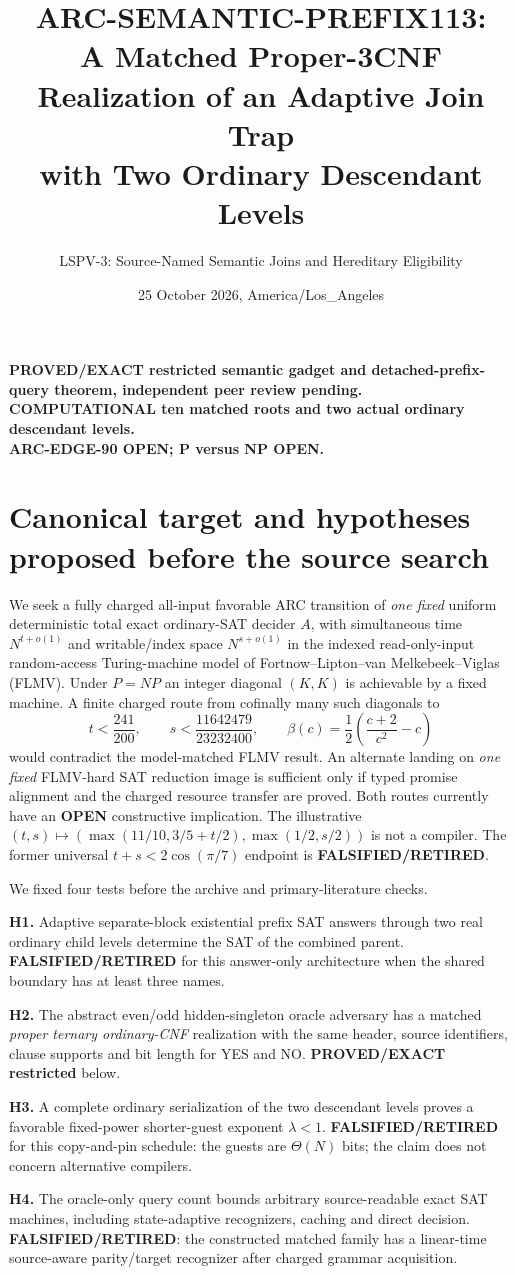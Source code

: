 \documentclass[11pt]{article}
\title{ARC-SEMANTIC-PREFIX113:\\ A Matched Proper-3CNF Realization of an Adaptive Join Trap\\ with Two Ordinary Descendant Levels}
\author{LSPV-3: Source-Named Semantic Joins and Hereditary Eligibility}
\date{25 October 2026, America/Los\_Angeles}
\begin{document}
\maketitle
\begin{center}
\textbf{PROVED/EXACT restricted semantic gadget and detached-prefix-query theorem, independent peer review pending.}\\
\textbf{COMPUTATIONAL ten matched roots and two actual ordinary descendant levels.}\\
\textbf{ARC-EDGE-90 OPEN; P versus NP OPEN.}
\end{center}

\section{Canonical target and hypotheses proposed before the source search}
We seek a fully charged all-input favorable ARC transition of \emph{one fixed}
uniform deterministic total exact ordinary-SAT decider $A$, with simultaneous
time $N^{t+o(1)}$ and writable/index space $N^{s+o(1)}$ in the indexed
read-only-input random-access Turing-machine model of
Fortnow--Lipton--van Melkebeek--Viglas (FLMV). Under $P=NP$ an integer
diagonal $(K,K)$ is achievable by a fixed machine. A finite charged route
from cofinally many such diagonals to
\[
 t<\frac{241}{200},\qquad s<\frac{11642479}{23232400},\qquad
 \beta(c)=\frac12\left(\frac{c+2}{c^2}-c\right)
\]
would contradict the model-matched FLMV result. An alternate landing on
\emph{one fixed} FLMV-hard SAT reduction image is sufficient only if typed
promise alignment and the charged resource transfer are proved. Both routes
currently have an \textbf{OPEN} constructive implication. The illustrative
$(t,s)\mapsto(\max(11/10,3/5+t/2),\max(1/2,s/2))$ is not a compiler.
The former universal $t+s<2\cos(\pi/7)$ endpoint is
\textbf{FALSIFIED/RETIRED}.

We fixed four tests before the archive and primary-literature checks.
\par\noindent \textbf{H1.} Adaptive separate-block existential prefix SAT
answers through two real ordinary child levels determine the SAT of the
combined parent. \textbf{FALSIFIED/RETIRED} for this answer-only
architecture when the shared boundary has at least three names.
\par\noindent \textbf{H2.} The abstract even/odd hidden-singleton oracle
adversary has a matched \emph{proper ternary ordinary-CNF} realization with
the same header, source identifiers, clause supports and bit length for YES
and NO. \textbf{PROVED/EXACT restricted} below.
\par\noindent \textbf{H3.} A complete ordinary serialization of the two
descendant levels proves a favorable fixed-power shorter-guest exponent
$\lambda<1$. \textbf{FALSIFIED/RETIRED} for this copy-and-pin schedule:
the guests are $\Theta(N)$ bits; the claim does not concern alternative
compilers.
\par\noindent \textbf{H4.} The oracle-only query count bounds arbitrary
source-readable exact SAT machines, including state-adaptive recognizers,
caching and direct decision. \textbf{FALSIFIED/RETIRED}: the constructed
matched family has a linear-time source-aware parity/target recognizer after
charged grammar acquisition.
\end{document}
